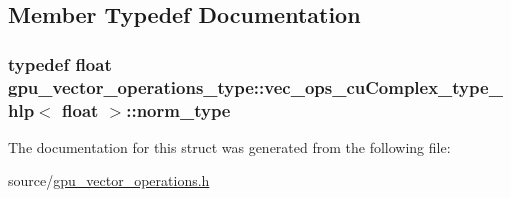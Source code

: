 \subsection{Member Typedef Documentation}
\hypertarget{structgpu__vector__operations__type_1_1vec__ops__cuComplex__type__hlp_3_01float_01_4_a51d3eb3785dffab72135d13e1cbeff4d}{
\subsubsection[{norm\-\_\-type}]{\setlength{\rightskip}{0pt plus 5cm}typedef float {\bf gpu\-\_\-vector\-\_\-operations\-\_\-type\-::vec\-\_\-ops\-\_\-cu\-Complex\-\_\-type\-\_\-hlp}$<$ float $>$\-::{\bf norm\-\_\-type}}}\label{structgpu__vector__operations__type_1_1vec__ops__cuComplex__type__hlp_3_01float_01_4_a51d3eb3785dffab72135d13e1cbeff4d}


The documentation for this struct was generated from the following file\-:\begin{DoxyCompactItemize}
\item 
source/\hyperlink{gpu__vector__operations_8h}{gpu\-\_\-vector\-\_\-operations.\-h}\end{DoxyCompactItemize}
